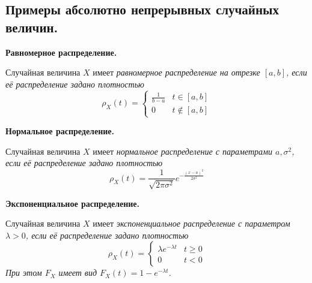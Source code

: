 \subsection{Примеры абсолютно непрерывных случайных величин.}
\begin{example}
    \textbf{Равномерное распределение.}

    Случайная величина $X$ имеет \it{равномерное распределение на отрезке} $[a, b]$, если её распределение
    задано плотностью
    \[
        \rho_X(t) =
        \begin{cases}
            \frac{1}{b - a} & t \in [a, b]\\
            0 & t \notin [a, b]
        \end{cases}
    \]
\end{example}
\begin{example}
    \textbf{Нормальное распределение.}

    Случайная величина $X$ имеет \it{нормальное распределение} с параметрами $a, \sigma^2$, если её распределение задано
    плотностью
    \[
        \rho_X(t) = \frac{1}{\sqrt{2\pi\sigma^2}}e^{-\frac{(x - a)^2}{2\sigma^2}}
    \]
\end{example}
\begin{example}
    \textbf{Экспоненциальное распределение.}

    Случайная величина $X$ имеет \it{экспоненциальное распределение} с параметром $\lambda > 0$, если её распределение
    задано плотностью
    \[
        \rho_X(t) =
        \begin{cases}
            \lambda e^{-\lambda t} & t \geq 0\\
            0 & t < 0
        \end{cases}
    \]
    При этом $F_X$ имеет вид $F_X(t) = 1 - e^{-\lambda t}$.
\end{example}

